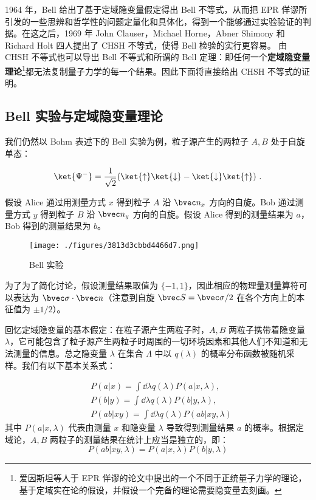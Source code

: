 

1964 年，Bell 给出了基于定域隐变量假定得出 Bell 不等式，从而把 EPR 佯谬所引发的一些思辨和哲学性的问题定量化和具体化，得到一个能够通过实验验证的判据。在这之后，1969 年 John Clauser，Michael Horne，Abner Shimony 和 Richard Holt 四人提出了 CHSH 不等式，使得 Bell 检验的实行更容易。 由 CHSH 不等式也可以导出 Bell 不等式和所谓的 Bell 定理：即任何一个\textbf{定域隐变量理论}\footnote{爱因斯坦等人于 EPR 佯谬的论文中提出的一个不同于正统量子力学的理论，基于定域实在论的假设，并假设一个完备的理论需要隐变量去刻画。}都无法复制量子力学的每一个结果。因此下面将直接给出 CHSH 不等式的证明。

\subsection{Bell 实验与定域隐变量理论}
我们仍然以 Bohm 表述下的 Bell 实验为例，粒子源产生的两粒子 $A,B$ 处于自旋单态：

\begin{equation}
\ket{\Psi^-}=\frac{1}{\sqrt{2}}(\ket{\uparrow}\ket{\downarrow}-\ket{\downarrow}\ket{\uparrow})~.
\end{equation}

假设 Alice 通过用测量方式 $x$ 得到粒子 $A$ 沿 $\bvec n_x$ 方向的自旋。Bob 通过测量方式 $y$ 得到粒子 $B$ 沿 $\bvec n_y$ 方向的自旋。假设 Alice 得到的测量结果为 $a$，Bob 得到的测量结果为 $b$。

\begin{figure}[ht]
\centering
\texttt{[image: ./figures/3813d3cbbd4466d7.png]}
\caption{Bell 实验} \label{fig_chsh_1}
\end{figure}

为了为了简化讨论，假设测量结果取值为 $\{-1,1\}$，因此相应的物理量测量算符可以表达为 $\bvec \sigma \cdot \bvec n$（注意到自旋 $\bvec S=\bvec \sigma/2$ 在各个方向上的本征值为 $\pm 1/2$）。

回忆定域隐变量的基本假定：在粒子源产生两粒子时，$A,B$ 两粒子携带着隐变量 $\lambda$，它可能包含了粒子源产生两粒子时周围的一切环境因素和其他人们不知道和无法测量的信息。总之隐变量 $\lambda$ 在集合 $\Lambda$ 中以 $q(\lambda)$ 的概率分布函数被随机采样。我们有以下基本关系式：

\begin{equation}
\begin{aligned}
&P(a|x)=\int \dd \lambda q(\lambda)P(a|x,\lambda),\\
&P(b|y)=\int \dd \lambda q(\lambda)P(b|y,\lambda),\\
&P(ab|xy)=\int \dd \lambda q(\lambda)P(ab|xy,\lambda)
\end{aligned}
\end{equation}
其中 $P(a|x,\lambda)$ 代表由测量 $x$ 和隐变量 $\lambda$ 导致得到测量结果 $a$ 的概率。根据定域论，$A,B$ 两粒子的测量结果在统计上应当是独立的，即：
\begin{equation}
P(ab|xy,\lambda)=P(a|x,\lambda)P(b|y,\lambda)
\end{equation}
